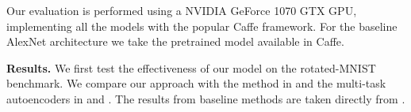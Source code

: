 \documentclass{article}
\newcommand{\myparagraph}[1]{\vspace{5pt}\noindent\textbf{#1}}
\begin{document}
Our evaluation is performed using a NVIDIA GeForce 1070 GTX GPU, implementing all the models with the popular Caffe \cite{jia2014caffe} framework. For the baseline AlexNet architecture we take the pretrained model available in Caffe.


















\vspace{-0.2em}
\myparagraph{Results.} 
We first test the effectiveness of our model on the rotated-MNIST benchmark. We compare our approach with the method in \cite{motiian2017unified} and the multi-task autoencoders in \cite{ghifary2015domain} and \cite{rifaiexplicit}. The results from baseline methods are taken directly from \cite{motiian2017unified}.
\begin{table}[t]
			\caption{Rotated-MNIST dataset: comparison with previous methods. } 
		\centering
		\label{tab:mnist}
        \vspace{-0.25cm}
\end{table}
\end{document}
